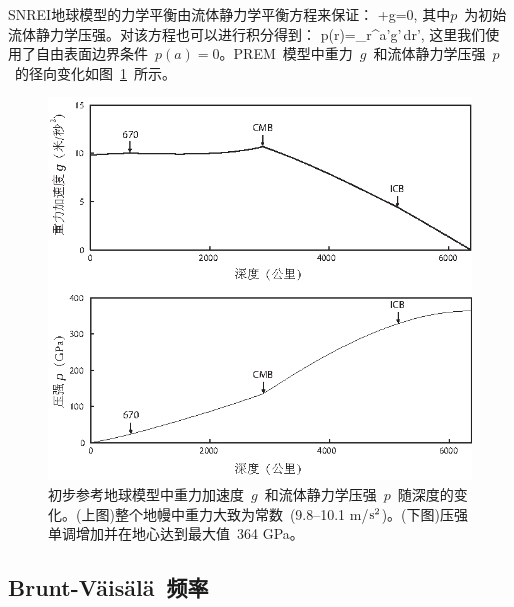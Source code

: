 SNREI地球模型的力学平衡由流体静力学平衡方程来保证：
%
%
\eq
\dpp+\rho g=0,
\en
其中$p$~为初始流体静力学压强。对该方程也可以进行积分得到：
\eq
p(r)=\int_r^a\rho'g'\,dr',
\label{eq:8.pr}
\en
这里我们使用了自由表面边界条件~$p(a)=0$。PREM~模型中重力~$g$~和流体静力学压强~$p$~的径向变化如图~\ref{fig:premgrav&press}~所示。
\begin{figure}[!t]
\begin{center}
\includegraphics{../figures/chap08/fig02.eps}
\end{center}
\caption[PREM grav&stress]{\label{fig:premgrav&press}
初步参考地球模型中重力加速度~$g$~和流体静力学压强~$p$~随深度的变化。(上图)整个地幔中重力大致为常数~(9.8\hspace{0.2 mm}--10.1 m/${\rm s}^2$)。(下图)压强单调增加并在地心达到最大值~364 GPa。
%
%
}
\end{figure}

%
%
%

\renewcommand{\thesubsection}{$\!\!\!\raise1.3ex\hbox{$\star$}\!\!$
\arabic{chapter}.\arabic{section}.\arabic{subsection}}
\subsection{Brunt-V\"{a}is\"{a}l\"{a}~频率}
%
%
\label{section:8.Brunt}
\renewcommand{\thesubsection}{\arabic{chapter}.\arabic{section}.\arabic{subsection}}

